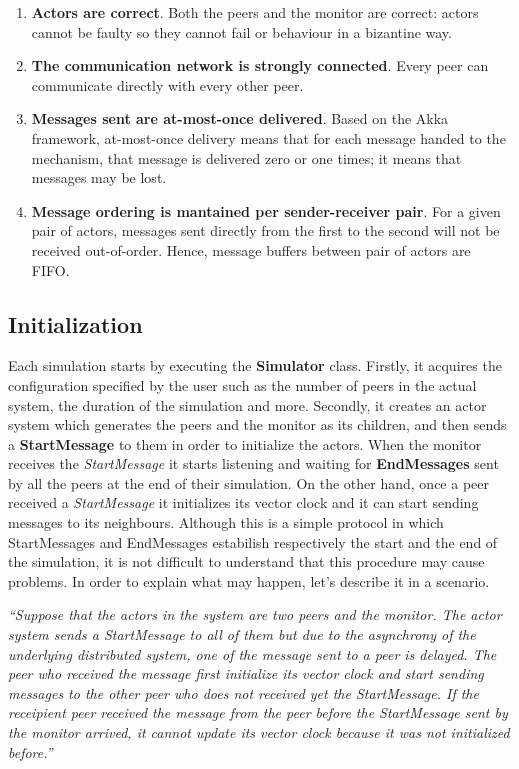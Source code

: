 \documentclass[11pt]{article}
\begin{document}
\begin{enumerate}
\item \textbf{Actors are correct}. Both the peers and the monitor are correct: actors cannot be faulty so they cannot fail or behaviour in a bizantine way.
\item \textbf{The communication network is strongly connected}. Every peer can communicate directly with every other peer.
\item \textbf{Messages sent are at-most-once delivered}. Based on the Akka framework, at-most-once delivery means that for each message handed to the mechanism, that message is delivered zero or one times; it means that messages may be lost.
\item \textbf{Message ordering is mantained per sender-receiver pair}. For a given pair of actors, messages sent directly from the first to the second will not be received out-of-order. Hence, message buffers between pair of actors are FIFO.
\end{enumerate}

\subsection{Initialization}

Each simulation starts by executing the \textbf{Simulator} class. Firstly, it acquires the configuration specified by the user such as the number of peers in the actual system, the duration of the simulation and more. Secondly, it creates an actor system which generates the peers and the monitor as its children, and then sends a \textbf{StartMessage} to them in order to initialize the actors. When the monitor receives the \textit{StartMessage} it starts listening and waiting for \textbf{EndMessages} sent by all the peers at the end of their simulation. On the other hand, once a peer received a \textit{StartMessage} it initializes its vector clock and it can start sending messages to its neighbours.
Although this is a simple protocol in which StartMessages and EndMessages estabilish respectively the start and the end of the simulation, it is not difficult to understand that this procedure may cause problems. In order to explain what may happen, let's describe it in a scenario.

\vspace{0.2cm}
\emph{``Suppose that the actors in the system are two peers and the monitor. The actor system sends a StartMessage to all of them but due to the asynchrony of the underlying distributed system, one of the message sent to a peer is delayed. The peer who received the message first initialize its vector clock and start sending messages to the other peer who does not received yet the StartMessage. If the receipient peer received the message from the peer before the StartMessage sent by the monitor arrived, it cannot update its vector clock because it was not initialized before.''}
\vspace{0.2cm}
\end{document}
